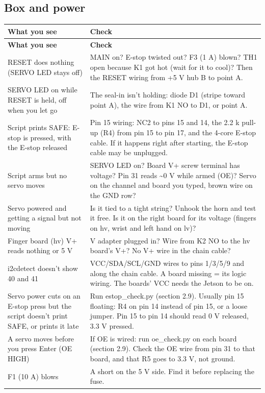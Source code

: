 \documentclass[11pt,letterpaper]{article}
\newcommand{\code}[1]{\textcolor{codeblue}{\ttfamily\smaller\relax #1}}
\begin{document}
\subsection{Box and power}
{\small
\begin{longtable}{|>{\raggedright\arraybackslash}p{}|>{\raggedright\arraybackslash}p{}|}
\hline
\rowcolor{tblhead}\textbf{What you see} & \textbf{Check} \\ \hline
\endfirsthead
\hline
\rowcolor{tblhead}\textbf{What you see} & \textbf{Check} \\ \hline
\endhead
RESET does nothing (SERVO LED stays off) & MAIN on? E-stop twisted out? F3 (1 A) blown? TH1 open because K1 got hot (wait for it to cool)? Then the RESET wiring from +5 V hub B to point A. \\ \hline
SERVO LED on while RESET is held, off when you let go & The seal-in isn't holding: diode D1 (stripe toward point A), the wire from K1 NO to D1, or point A. \\ \hline
Script prints SAFE: E-stop is pressed, with the E-stop released & Pin 15 wiring: NC2 to pins 15 and 14, the 2.2 k\textohm{} pull-up (R4) from pin 15 to pin 17, and the 4-core E-stop cable. If it happens right after starting, the E-stop cable may be unplugged. \\ \hline
Script arms but no servo moves & SERVO LED on? Board V+ screw terminal has voltage? Pin 31 reads \textasciitilde{}0 V while armed (OE)? Servo on the channel and board you typed, brown wire on the GND row? \\ \hline
Servo powered and getting a signal but not moving & Is it tied to a tight string? Unhook the horn and test it free. Is it on the right board for its voltage (fingers on \code{hv}, wrist and left hand on \code{lv})? \\ \hline
Finger board (\code{hv}) V+ reads nothing or 5 V & 8.4 V adapter plugged in? Wire from K2 NO to the \code{hv} board's V+? No V+ wire in the chain cable? \\ \hline
\code{i2cdetect} doesn't show 40 and 41 & VCC/SDA/SCL/GND wires to pins 1/3/5/9 and along the chain cable. A board missing = its logic wiring. The boards' VCC needs the Jetson to be on. \\ \hline
Servo power cuts on an E-stop press but the script doesn't print SAFE, or prints it late & Run \code{estop\_\allowbreak{}check.py} (section 2.9). Usually pin 15 floating: R4 on pin 14 instead of pin 15, or a loose jumper. Pin 15 to pin 14 should read 0 V released, 3.3 V pressed. \\ \hline
A servo moves before you press Enter (OE HIGH) & If OE is wired: run \code{oe\_\allowbreak{}check.py} on each board (section 2.9). Check the OE wire from pin 31 to that board, and that R5 goes to 3.3 V, not ground. \\ \hline
F1 (10 A) blows & A short on the 5 V side. Find it before replacing the fuse. \\ \hline
\end{longtable}}
\end{document}
